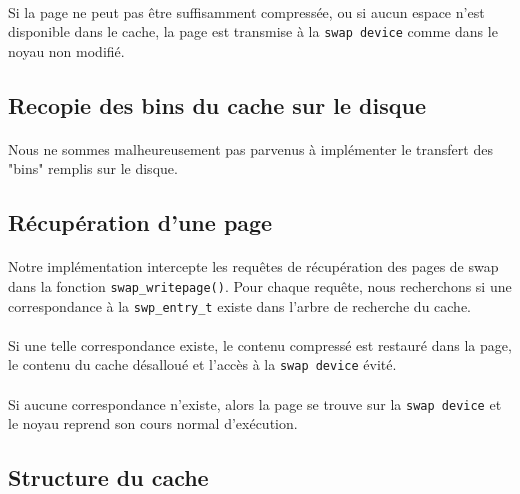 \documentclass[a4paper]{article}
\begin{document}
    \paragraph{}Si la page ne peut pas être suffisamment compressée, ou si
aucun espace n'est disponible dans le cache, la page est transmise à la
\texttt{swap device} comme dans le noyau non modifié.

 \subsection{Recopie des bins du cache sur le disque}

    \paragraph{}Nous ne sommes malheureusement pas parvenus à implémenter le
transfert des "bins" remplis sur le disque.

 \subsection{Récupération d'une page}

    \paragraph{}Notre implémentation intercepte les requêtes de récupération
des pages de swap dans la fonction \texttt{swap\_writepage()}. Pour chaque
requête, nous recherchons si une correspondance à la \texttt{swp\_entry\_t}
existe dans l'arbre de recherche du cache.

    \paragraph{}Si une telle correspondance existe, le contenu compressé est
restauré dans la page, le contenu du cache désalloué et l'accès à la 
\texttt{swap device} évité.

    \paragraph{}Si aucune correspondance n'existe, alors la page se trouve sur
la \texttt{swap device} et le noyau reprend son cours normal d'exécution.

 \subsection{Structure du cache}
\end{document}
